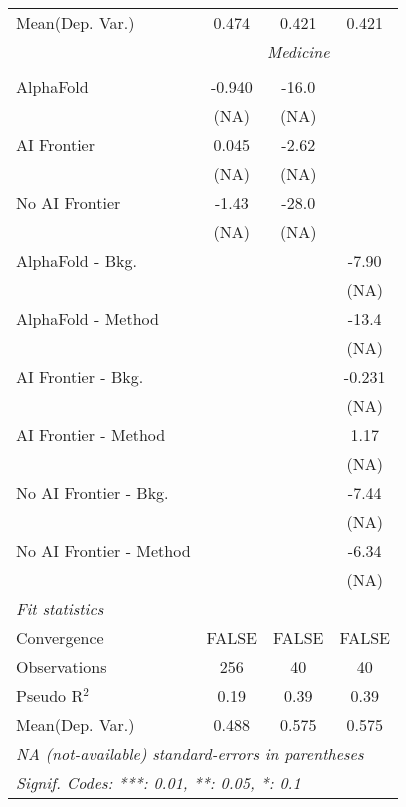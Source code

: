 \begin{tabular}{lccc}
Mean(Dep. Var.) & 0.474 & 0.421 & 0.421 \\
 & \multicolumn{3}{c}{\textit{Medicine}} \\ \\
   AlphaFold               & -0.940 & -16.0 &   \\   
                           & (NA)   & (NA)  &   \\   
   AI Frontier             & 0.045  & -2.62 &   \\   
                           & (NA)   & (NA)  &   \\   
   No AI Frontier          & -1.43  & -28.0 &   \\   
                           & (NA)   & (NA)  &   \\   
   AlphaFold - Bkg.        &        &       & -7.90\\   
                           &        &       & (NA)\\   
   AlphaFold - Method      &        &       & -13.4\\   
                           &        &       & (NA)\\   
   AI Frontier - Bkg.      &        &       & -0.231\\   
                           &        &       & (NA)\\   
   AI Frontier - Method    &        &       & 1.17\\   
                           &        &       & (NA)\\   
   No AI Frontier - Bkg.   &        &       & -7.44\\   
                           &        &       & (NA)\\   
   No AI Frontier - Method &        &       & -6.34\\   
                           &        &       & (NA)\\   
   \midrule
   \emph{Fit statistics}\\
   Convergence             &FALSE   & FALSE & FALSE\\  
   Observations            & 256    & 40    & 40\\  
   Pseudo R$^2$            & 0.19   & 0.39  & 0.39\\  
Mean(Dep. Var.) & 0.488 & 0.575 & 0.575 \\
   \midrule \midrule
   \multicolumn{4}{l}{\emph{NA (not-available) standard-errors in parentheses}}\\
   \multicolumn{4}{l}{\emph{Signif. Codes: ***: 0.01, **: 0.05, *: 0.1}}\\
\end{tabular}
\par\endgroup
